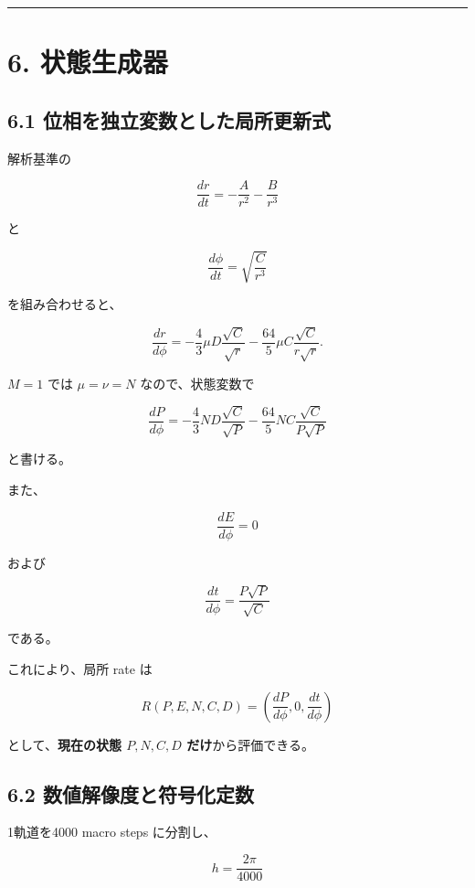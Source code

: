 \documentclass[
  a4paper,
]{ltjsarticle}
\begin{document}
\begin{center}\rule{0.5\linewidth}{0.5pt}\end{center}

\section{6. 状態生成器}\label{ux72b6ux614bux751fux6210ux5668}

\subsection{6.1
位相を独立変数とした局所更新式}\label{ux4f4dux76f8ux3092ux72ecux7acbux5909ux6570ux3068ux3057ux305fux5c40ux6240ux66f4ux65b0ux5f0f}

解析基準の

\[
\frac{dr}{dt}
=-\frac{A}{r^2}-\frac{B}{r^3}
\]

と

\[
\frac{d\phi}{dt}=\sqrt{\frac{C}{r^3}}
\]

を組み合わせると、

\[
\frac{dr}{d\phi}
=
-\frac{4}{3}\mu D\frac{\sqrt C}{\sqrt r}
-\frac{64}{5}\mu C\frac{\sqrt C}{r\sqrt r}.
\]

\(M=1\) では \(\mu=\nu=N\) なので、状態変数で

\[
\boxed{
\frac{dP}{d\phi}
=
-\frac{4}{3}ND\frac{\sqrt C}{\sqrt P}
-\frac{64}{5}NC\frac{\sqrt C}{P\sqrt P}
}
\]

と書ける。

また、

\[
\boxed{
\frac{dE}{d\phi}=0
}
\]

および

\[
\boxed{
\frac{dt}{d\phi}
=
\frac{P\sqrt P}{\sqrt C}
}
\]

である。

これにより、局所 rate は

\[
R(P,E,N,C,D)
=
\left(
\frac{dP}{d\phi},
0,
\frac{dt}{d\phi}
\right)
\]

として、\textbf{現在の状態 \(P,N,C,D\) だけ}から評価できる。

\subsection{6.2
数値解像度と符号化定数}\label{ux6570ux5024ux89e3ux50cfux5ea6ux3068ux7b26ux53f7ux5316ux5b9aux6570}

1軌道を4000 macro steps に分割し、

\[
h=\frac{2\pi}{4000}
\]
\end{document}
